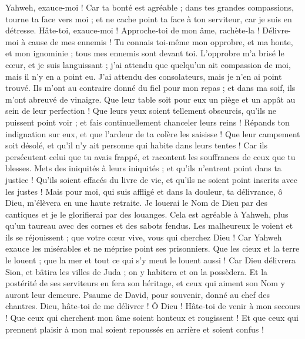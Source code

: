 \begin{multicols}{2}
Yahweh, exauce-moi ! Car ta bonté est agréable ; dans tes grandes compassions, tourne ta face vers moi ;
et ne cache point ta face à ton serviteur, car je suis en détresse. Hâte-toi, exauce-moi !
Approche-toi de mon âme, rachète-la ! Délivre-moi à cause de mes ennemis !
Tu connais toi-même mon opprobre, et ma honte, et mon ignominie ; tous mes ennemis sont devant toi.
L'opprobre m'a brisé le cœur, et je suis languissant ; j'ai attendu que quelqu'un ait compassion de moi, mais il n'y en a point eu. J'ai attendu des consolateurs, mais je n'en ai point trouvé.
Ils m'ont au contraire donné du fiel pour mon repas ; et dans ma soif, ils m'ont abreuvé de vinaigre.
Que leur table soit pour eux un piège et un appât au sein de leur perfection !
Que leurs yeux soient tellement obscurcis, qu'ils ne puissent point voir ; et fais continuellement chanceler leurs reins !
Répands ton indignation sur eux, et que l'ardeur de ta colère les saisisse !
Que leur campement soit désolé, et qu'il n'y ait personne qui habite dans leurs tentes !
Car ils persécutent celui que tu avais frappé, et racontent les souffrances de ceux que tu blesses.
Mets des iniquités à leurs iniquités ; et qu'ils n'entrent point dans ta justice !
Qu'ils soient effacés du livre de vie, et qu'ils ne soient point inscrits avec les justes !
Mais pour moi, qui suis affligé et dans la douleur, ta délivrance, ô Dieu, m'élèvera en une haute retraite.
Je louerai le Nom de Dieu par des cantiques et je le glorifierai par des louanges.
Cela est agréable à Yahweh, plus qu'un taureau avec des cornes et des sabots fendus.
Les malheureux le voient et ils se réjouissent ; que votre cœur vive, vous qui cherchez Dieu !
Car Yahweh exauce les misérables et ne méprise point ses prisonniers.
Que les cieux et la terre le louent ; que la mer et tout ce qui s'y meut le louent aussi !
Car Dieu délivrera Sion, et bâtira les villes de Juda ; on y habitera et on la possèdera.
Et la postérité de ses serviteurs en fera son héritage, et ceux qui aiment son Nom y auront leur demeure.
\VerseOne{}Psaume de David, pour souvenir, donné au chef des chantres.
Dieu, hâte-toi de me délivrer ! Ô Dieu ! Hâte-toi de venir à mon secours !
Que ceux qui cherchent mon âme soient honteux et rougissent ! Et que ceux qui prennent plaisir à mon mal soient repoussés en arrière et soient confus !

\end{multicols}

